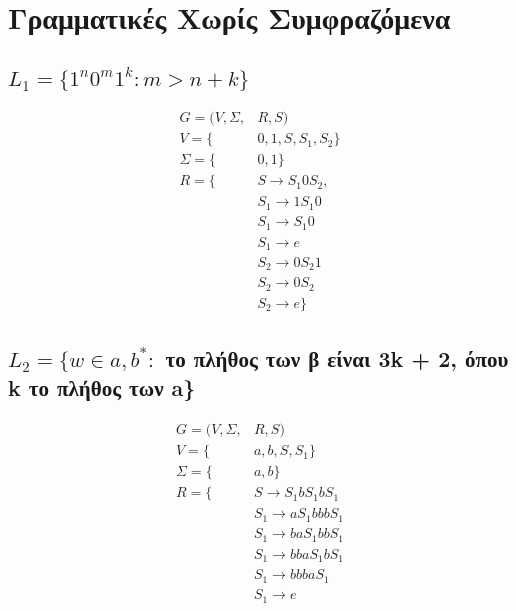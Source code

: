 \section{Γραμματικές Χωρίς Συμφραζόμενα}

\subsection{ $L_1 = \{1^n0^m1^k : m > n+ k\}$}
\begin{align*}
	G = (V, Σ, &R, S)\\
			V  = \{&0, 1, S, S_1, S_2\}\\
			Σ = \{&0, 1\}\\
			R = \{&S \xrightarrow{} S_1 0 S_2, \\
					 &S_1 \xrightarrow{} 1 S_1 0  \\ 
					 &S_1 \xrightarrow{} S_1 0     \\ 
					 &S_1 \xrightarrow{} e            \\
					 &S_2 \xrightarrow{} 0 S_2 1  \\
					 &S_2 \xrightarrow{} 0S_2      \\
					 &S_2 \xrightarrow{} e \}
\end{align*}

\subsection{$L_2 = \{w \in {a, b}^* :$ το πλήθος των β είναι 3k + 2, όπου k το πλήθος των a\}}
\begin{align*}
	G = (V, Σ, &R, S)\\
	V  = \{&a, b, S, S_1\}\\
	Σ = \{&a, b\}\\
	R = \{&S \xrightarrow{} S_1 b S_1 b S_1\\
			 &S_1 \xrightarrow{} aS_1bbb S_1\\
			 &S_1 \xrightarrow{} baS_1bb S_1\\
			 &S_1 \xrightarrow{} bbaS_1b S_1\\
			 &S_1 \xrightarrow{} bbba S_1\\
			 &S_1 \xrightarrow{} e\\
\end{align*}


